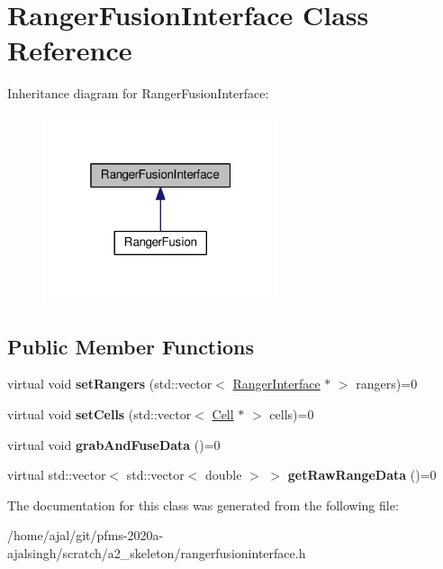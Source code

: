 \hypertarget{classRangerFusionInterface}{}\section{Ranger\+Fusion\+Interface Class Reference}
\label{classRangerFusionInterface}


Inheritance diagram for Ranger\+Fusion\+Interface\+:\nopagebreak
\begin{figure}[H]
\begin{center}
\leavevmode
\includegraphics[width=196pt]{classRangerFusionInterface__inherit__graph}
\end{center}
\end{figure}
\subsection*{Public Member Functions}
\begin{DoxyCompactItemize}
\item 
virtual void {\bfseries set\+Rangers} (std\+::vector$<$ \hyperlink{classRangerInterface}{Ranger\+Interface} $\ast$ $>$ rangers)=0\hypertarget{classRangerFusionInterface_aea3d7cf254c0553e624306ca06d86120}{}\label{classRangerFusionInterface_aea3d7cf254c0553e624306ca06d86120}

\item 
virtual void {\bfseries set\+Cells} (std\+::vector$<$ \hyperlink{classCell}{Cell} $\ast$ $>$ cells)=0\hypertarget{classRangerFusionInterface_ab0b45c2c462124ce74d54eb226044beb}{}\label{classRangerFusionInterface_ab0b45c2c462124ce74d54eb226044beb}

\item 
virtual void {\bfseries grab\+And\+Fuse\+Data} ()=0\hypertarget{classRangerFusionInterface_ada6afdab2ce6d58a1bd0134f5e2be23f}{}\label{classRangerFusionInterface_ada6afdab2ce6d58a1bd0134f5e2be23f}

\item 
virtual std\+::vector$<$ std\+::vector$<$ double $>$ $>$ {\bfseries get\+Raw\+Range\+Data} ()=0\hypertarget{classRangerFusionInterface_a9d60ca5866261026b870d7c0171587f5}{}\label{classRangerFusionInterface_a9d60ca5866261026b870d7c0171587f5}

\end{DoxyCompactItemize}


The documentation for this class was generated from the following file\+:\begin{DoxyCompactItemize}
\item 
/home/ajal/git/pfms-\/2020a-\/ajalsingh/scratch/a2\+\_\+skeleton/rangerfusioninterface.\+h\end{DoxyCompactItemize}

